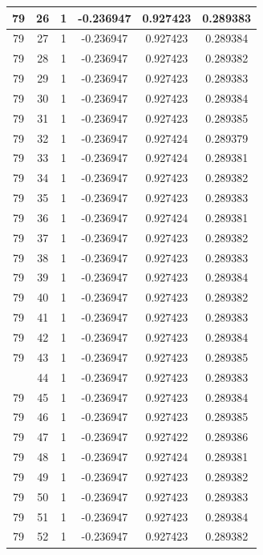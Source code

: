 \documentclass[12pt,a4paper]{article}
\numberwithin{equation}{section}
\numberwithin{figure}{section}
\numberwithin{table}{section}
\begin{document}
\begin{longtable}{|c|c|c|c|c|c|}
79 & 26 & 1 & -0.236947 & 0.927423 & 0.289383 \\ \hline
79 & 27 & 1 & -0.236947 & 0.927423 & 0.289384 \\ \hline
79 & 28 & 1 & -0.236947 & 0.927423 & 0.289382 \\ \hline
79 & 29 & 1 & -0.236947 & 0.927423 & 0.289383 \\ \hline
79 & 30 & 1 & -0.236947 & 0.927423 & 0.289384 \\ \hline
79 & 31 & 1 & -0.236947 & 0.927423 & 0.289385 \\ \hline
79 & 32 & 1 & -0.236947 & 0.927424 & 0.289379 \\ \hline
79 & 33 & 1 & -0.236947 & 0.927424 & 0.289381 \\ \hline
79 & 34 & 1 & -0.236947 & 0.927423 & 0.289382 \\ \hline
79 & 35 & 1 & -0.236947 & 0.927423 & 0.289383 \\ \hline
79 & 36 & 1 & -0.236947 & 0.927424 & 0.289381 \\ \hline
79 & 37 & 1 & -0.236947 & 0.927423 & 0.289382 \\ \hline
79 & 38 & 1 & -0.236947 & 0.927423 & 0.289383 \\ \hline
79 & 39 & 1 & -0.236947 & 0.927423 & 0.289384 \\ \hline
79 & 40 & 1 & -0.236947 & 0.927423 & 0.289382 \\ \hline
79 & 41 & 1 & -0.236947 & 0.927423 & 0.289383 \\ \hline
79 & 42 & 1 & -0.236947 & 0.927423 & 0.289384 \\ \hline
79 & 43 & 1 & -0.236947 & 0.927423 & 0.289385 \\ \hline
\pagebreak
79 & 44 & 1 & -0.236947 & 0.927423 & 0.289383 \\ \hline
79 & 45 & 1 & -0.236947 & 0.927423 & 0.289384 \\ \hline
79 & 46 & 1 & -0.236947 & 0.927423 & 0.289385 \\ \hline
79 & 47 & 1 & -0.236947 & 0.927422 & 0.289386 \\ \hline
79 & 48 & 1 & -0.236947 & 0.927424 & 0.289381 \\ \hline
79 & 49 & 1 & -0.236947 & 0.927423 & 0.289382 \\ \hline
79 & 50 & 1 & -0.236947 & 0.927423 & 0.289383 \\ \hline
79 & 51 & 1 & -0.236947 & 0.927423 & 0.289384 \\ \hline
79 & 52 & 1 & -0.236947 & 0.927423 & 0.289382 \\ \hline

\end{longtable}
\end{document}
